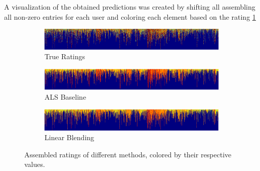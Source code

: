 A visualization of the obtained predictions was created by shifting all
assembling all non-zero entries for each user and coloring each element
based on the rating \ref{fig:matrix}

\begin{figure}[!tbp]
  \begin{subfigure}[b]{0.99\columnwidth}
    \includegraphics[width=.99\columnwidth]{figures/matrix_validation_clipped.png}
    \caption{True Ratings}
  \end{subfigure}
  \hfill
  \begin{subfigure}[b]{0.99\columnwidth}
    \includegraphics[width=.99\columnwidth]{figures/matrix_validation_1_clipped.png}
    \caption{ALS Baseline}
  \end{subfigure}
  \begin{subfigure}[b]{0.99\columnwidth}
    \includegraphics[width=.99\columnwidth]{figures/matrix_blending_clipped.png}
    \caption{Linear Blending}
  \end{subfigure}
  \caption{Assembled ratings of different methods, colored by their respective
  values.}
  \label{fig:matrix}
\end{figure}
